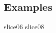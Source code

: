 \subsection*{Examples}
\label{sec:experimental.examples}


{slice06}
{slice08}

\lstset{basicstyle=\small\ttfamily}
